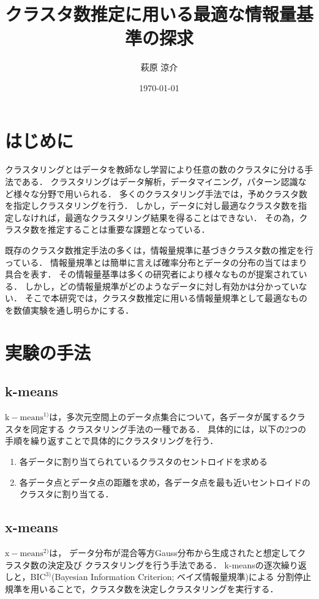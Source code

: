 \documentclass[10pt,a4j,twocolumn]{ltjsarticle}
\author{萩原 涼介}
\title{クラスタ数推定に用いる最適な情報量基準の探求}
\date{\today}
\begin{document}
\maketitle
\section{はじめに}
クラスタリングとはデータを教師なし学習により任意の数のクラスタに分ける手法である．
クラスタリングはデータ解析，データマイニング，パターン認識など様々な分野で用いられる．
多くのクラスタリング手法では，予めクラスタ数を指定しクラスタリングを行う．
しかし，データに対し最適なクラスタ数を指定しなければ，最適なクラスタリング結果を得ることはできない．
その為，クラスタ数を推定することは重要な課題となっている．

既存のクラスタ数推定手法の多くは，情報量規準に基づきクラスタ数の推定を行っている．
情報量規準とは簡単に言えば確率分布とデータの分布の当てはまり具合を表す．
その情報量基準は多くの研究者により様々なものが提案されている．
しかし，どの情報量規準がどのようなデータに対し有効かは分かっていない．
そこで本研究では，クラスタ数推定に用いる情報量規準として最適なものを数値実験を通し明らかにする．

\section{実験の手法}
% 
\subsection{k-means}
$\mathrm{k-means}^{1)}$は，多次元空間上のデータ点集合について，各データが属するクラスタを同定する
クラスタリング手法の一種である．
具体的には，以下の2つの手順を繰り返すことで具体的にクラスタリングを行う．
\begin{enumerate}
  \item 各データに割り当てられているクラスタのセントロイドを求める
  \item 各データ点とデータ点の距離を求め，各データ点を最も近いセントロイドのクラスタに割り当てる．
\end{enumerate}

\subsection{x-means}
$\mathrm{x-means}^{2)}$は，
データ分布が混合等方Gauss分布から生成されたと想定してクラスタ数の決定及び
クラスタリングを行う手法である．
k-meansの逐次繰り返しと，$\mathrm{BIC}^{3)}$(Bayesian Information Criterion; ベイズ情報量規準)による
分割停止規準を用いることで，クラスタ数を決定しクラスタリングを実行する．
\end{document}
